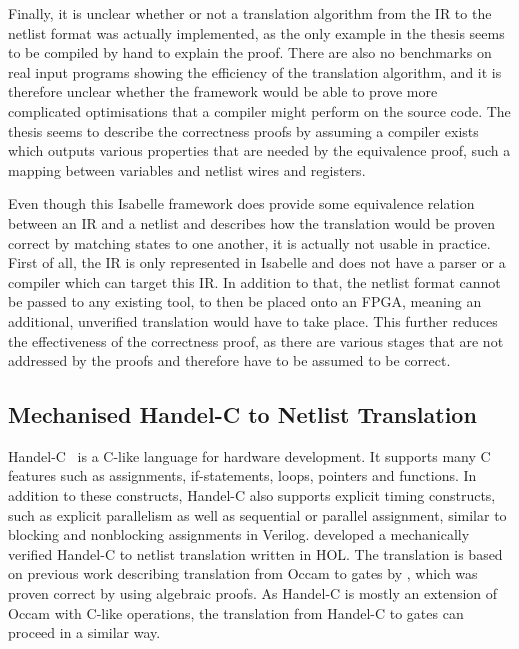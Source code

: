 Finally, it is unclear whether or not a translation algorithm from the IR to the
netlist format was actually implemented, as the only example in the thesis seems
to be compiled by hand to explain the proof.  There are also no benchmarks on
real input programs showing the efficiency of the translation algorithm, and it
is therefore unclear whether the framework would be able to prove more
complicated optimisations that a compiler might perform on the source code.  The
thesis seems to describe the correctness proofs by assuming a compiler exists
which outputs various properties that are needed by the equivalence proof, such
a mapping between variables and netlist wires and registers.

Even though this Isabelle framework does provide some equivalence relation
between an IR and a netlist and describes how the translation would be proven
correct by matching states to one another, it is actually not usable in
practice.  First of all, the IR is only represented in Isabelle and does not
have a parser or a compiler which can target this IR.  In addition to that, the
netlist format cannot be passed to any existing tool, to then be placed onto an
\gls{FPGA}, meaning an additional, unverified translation would have to take
place.  This further reduces the effectiveness of the correctness proof, as
there are various stages that are not addressed by the proofs and therefore have
to be assumed to be correct.

\subsection{Mechanised Handel-C to Netlist Translation}%
\label{sec:bg:mechaniced-handel-c-to-netlist-translation}

Handel-C~\cite{bowen98_handel_c_languag_refer_manual} is a C-like language for
hardware development.  It supports many C features such as assignments,
if-statements, loops, pointers and functions.  In addition to these constructs,
Handel-C also supports explicit timing constructs, such as explicit parallelism
as well as sequential or parallel assignment, similar to blocking and
nonblocking assignments in Verilog.
\textcite{perna12_mechan_wire_wise_verif_handel_c_synth} developed a
mechanically verified Handel-C to netlist translation written in HOL. The
translation is based on previous work describing translation from Occam to gates
by \textcite{page91_compil_occam}, which was proven correct by
\textcite{jifeng93_towar} using algebraic proofs.  As Handel-C is mostly an
extension of Occam with C-like operations, the translation from Handel-C to
gates can proceed in a similar way.

